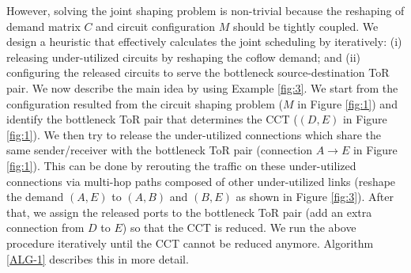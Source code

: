However, solving the joint shaping problem is non-trivial because the reshaping of demand matrix $C$ and  circuit configuration $M$ should be tightly coupled.
We design a heuristic that effectively calculates the joint scheduling by
iteratively:
(i) releasing under-utilized circuits by reshaping the coflow demand; and
(ii) configuring the released circuits to serve the bottleneck source-destination ToR pair.
We now describe the main idea by using Example \ref{fig:3}.
We start from the configuration resulted from the circuit shaping problem ($M$ in Figure \ref{fig:1}) and identify the bottleneck ToR pair that determines the CCT ($(D,E)$ in Figure \ref{fig:1}).
We then try to release the under-utilized connections which share the same sender/receiver with the bottleneck ToR pair (connection $A\rightarrow E$ in Figure \ref{fig:1}).
This can be done by rerouting the traffic on these under-utilized connections via multi-hop paths composed of other under-utilized links (reshape the demand $(A, E)$ to $(A, B)$ and $(B, E)$ as shown in Figure \ref{fig:3}).
After that, we assign the released ports to the bottleneck ToR pair (add an extra connection from $D$ to $E$) so that the CCT is reduced.
We run the above procedure iteratively until the CCT cannot be reduced anymore.
Algorithm \ref{ALG-1} describes this in more detail.















